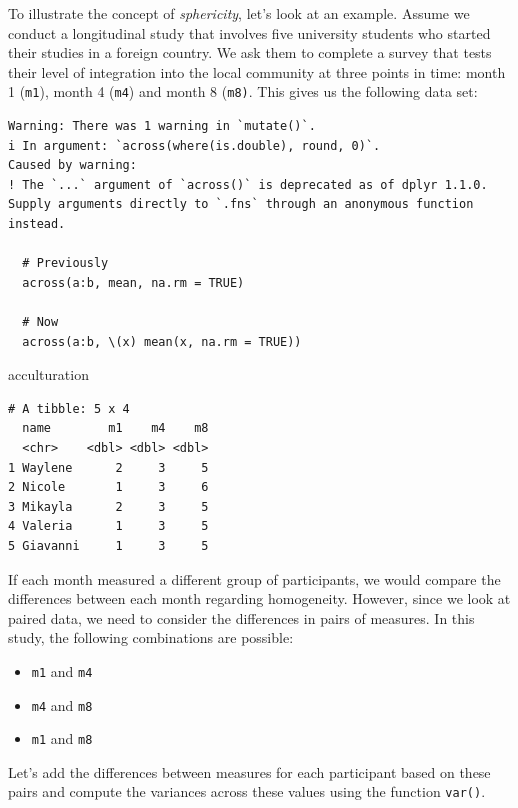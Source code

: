 \documentclass[
  letterpaper,
]{krantz}
\makeatletter
\newenvironment{Shaded}{\begin{snugshade}}{\end{snugshade}}
\newcommand{\NormalTok}[1]{\textcolor[rgb]{0.00,0.23,0.31}{#1}}
\newenvironment{kframe}{%
\medskip{}
\setlength{\fboxsep}{.8em}
 \def\at@end@of@kframe{}%
 \ifinner\ifhmode%
  \def\at@end@of@kframe{\end{minipage}}%
  \begin{minipage}{\columnwidth}%
 \fi\fi%
 \def\FrameCommand##1{\hskip\@totalleftmargin \hskip-\fboxsep
 \colorbox{shadecolor}{##1}\hskip-\fboxsep
     \hskip-\linewidth \hskip-\@totalleftmargin \hskip\columnwidth}%
 \MakeFramed {\advance\hsize-\width
   \@totalleftmargin\z@ \linewidth\hsize
   \@setminipage}}%
 {\par\unskip\endMakeFramed%
 \at@end@of@kframe}
\renewenvironment{Shaded}{\begin{kframe}}{\end{kframe}}
\makeatother
\begin{document}
To illustrate the concept of \emph{sphericity}, let's look at an
example. Assume we conduct a longitudinal study that involves five
university students who started their studies in a foreign country. We
ask them to complete a survey that tests their level of integration into
the local community at three points in time: month 1 (\texttt{m1}),
month 4 (\texttt{m4}) and month 8 (\texttt{m8)}. This gives us the
following data set:

\begin{verbatim}
Warning: There was 1 warning in `mutate()`.
i In argument: `across(where(is.double), round, 0)`.
Caused by warning:
! The `...` argument of `across()` is deprecated as of dplyr 1.1.0.
Supply arguments directly to `.fns` through an anonymous function instead.

  # Previously
  across(a:b, mean, na.rm = TRUE)

  # Now
  across(a:b, \(x) mean(x, na.rm = TRUE))
\end{verbatim}

\begin{Shaded}
\begin{Highlighting}[]
\NormalTok{acculturation}
\end{Highlighting}
\end{Shaded}

\begin{verbatim}
# A tibble: 5 x 4
  name        m1    m4    m8
  <chr>    <dbl> <dbl> <dbl>
1 Waylene      2     3     5
2 Nicole       1     3     6
3 Mikayla      2     3     5
4 Valeria      1     3     5
5 Giavanni     1     3     5
\end{verbatim}

If each month measured a different group of participants, we would
compare the differences between each month regarding homogeneity.
However, since we look at paired data, we need to consider the
differences in pairs of measures. In this study, the following
combinations are possible:

\begin{itemize}
\item
  \texttt{m1} and \texttt{m4}
\item
  \texttt{m4} and \texttt{m8}
\item
  \texttt{m1} and \texttt{m8}
\end{itemize}

Let's add the differences between measures for each participant based on
these pairs and compute the variances across these values using the
function \texttt{var()}.
\end{document}

